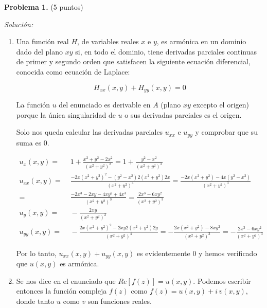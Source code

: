 \textbf{Problema 1.} (5 puntos)

\vspace{20px}
\textit{Solución:}
\\

\begin{enumerate}
[label=\alph*)]
    \item Una función real $H$, de variables reales $x$ e $y$, es armónica en un dominio dado del plano $xy$ si,
    en todo el dominio,
    tiene derivadas parciales continuas de primer y segundo orden que satisfacen la siguiente ecuación diferencial, conocida
    como ecuación de Laplace:

    \begin{equation*}
        H_{xx}(x,y) + H_{yy}(x,y) = 0
    \end{equation*}

    La función $u$ del enunciado es derivable en $A$ (plano $xy$ excepto el origen) porque la única singularidad de $u$ o sus
    derivadas parciales es el origen.

    Solo nos queda calcular las derivadas parciales $u_{xx}$ e $u_{yy}$ y comprobar que su suma es 0.

    \begin{align*}
        u_{x}(x,y) = & \;1 + \frac{x^2 + y^2 - 2x^2}{(x^2 + y^2)^2} = 1 + \frac{y^2 - x^2}{(x^2 + y^2)^2} \\[20pt]
        u_{xx}(x,y) = & \;\frac{-2x(x^2 + y^2)^2 - (y^2 - x^2)2(x^2 + y^2)2x}{(x^2 + y^2)^4} =
        \frac{-2x(x^2 + y^2) - 4x(y^2 - x^2)}{(x^2 + y^2)^3}  \\
        = & \; \frac{-2x^3 -2xy -4xy^2 + 4x^3}{(x^2 + y^2)^3} =
        \frac{2x^3 - 6xy^2}{(x^2 + y^2)^3} \\[20pt]
        u_{y}(x,y) = & \; - \frac{2xy}{(x^2 + y^2)^2} \\[20pt]
        u_{yy}(x,y) = & \; - \frac{2x(x^2 + y^2)^2 - 2xy2(x^2+y^2)2y}{(x^2 + y^2)^4}
        = - \frac{2x(x^2 + y^2) - 8xy^2}{(x^2 + y^2)^3} = - \frac{2x^3 - 6xy^2}{(x^2+y^2)^3}
    \end{align*}

    Por lo tanto, $u_{xx}(x,y) + u_{yy}(x,y)$ es evidentemente $0$ y hemos verificado que $u(x,y)$ es armónica.


    \vspace{20px}
    \item Se nos dice en el enunciado que $Re[f(z)] = u(x,y)$. Podemos escribir entonces
    la función compleja $f(z)$ como $f(z) = u(x,y) + i\,v(x,y)$,
    donde tanto $u$ como $v$ son funciones reales.


\end{enumerate}

